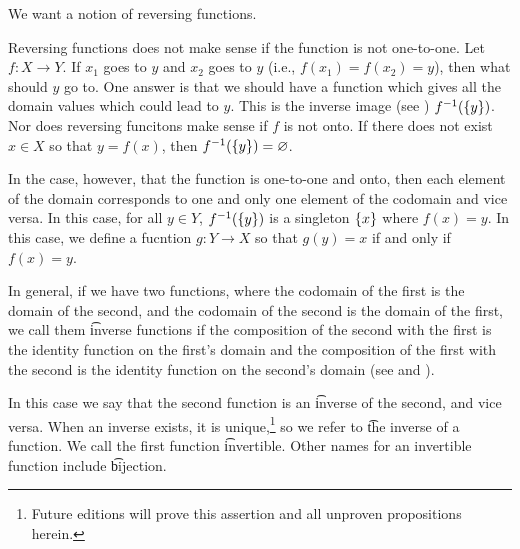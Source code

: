 

We want a notion of reversing functions.


Reversing functions does not make sense if the function is not one-to-one.
Let $f: X \to Y$.
If $x_1$ goes to $y$ and $x_2$ goes to $y$ (i.e., $f(x_1) = f(x_2) = y$), then what should $y$ go to.
One answer is that we should have a function which gives all the domain values which could lead to $y$.
This is the inverse image (see ) $f^{-1}(\{y\})$.
Nor does reversing funcitons make sense if $f$ is not onto.
If there does not exist $x \in X$ so that $y = f(x)$, then $f^{-1}(\{y\}) = \varnothing$.

In the case, however, that the function is one-to-one and onto, then each element of the domain corresponds to one and only one element of the codomain and vice versa.
In this case, for all $y \in Y$, $f^{-1}(\{y\})$ is a singleton $\{x\}$ where $f(x) = y$.
In this case, we define a fucntion $g: Y \to X$ so that $g(y) = x$ if and only if $f(x) = y$.


In general, if we have two functions, where the codomain of the first is the domain of the second, and the codomain of the second is the domain of the first, we call them \t{inverse functions} if the composition of the second with the first is the identity function on the first's domain and the composition of the first with the second is the identity function on the second's domain (see  and ).

In this case we say that the second function is an \t{inverse} of the second, and vice versa.
When an inverse exists, it is unique,\footnote{Future editions will prove this assertion and all unproven propositions herein.} so we refer to \t{the inverse} of a function.
We call the first function \t{invertible}.
Other names for an invertible function include \t{bijection}.

